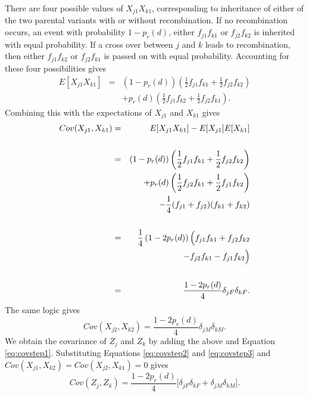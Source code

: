 \documentclass[sts]{imsart}
\begin{document}
There are four possible values of $X_{j1} X_{k1}$, corresponding to inheritance of either of the two parental variants with or without recombination. If no recombination occurs, an event with probability $1 - p_r(d)$, either $f_{j1} f_{k1}$ or $f_{j2} f_{k2}$ is inherited with equal probability. If a cross over between $j$ and $k$ leads to recombination, then either $f_{j1} f_{k2}$ or $f_{j2} f_{k1}$ is passed on with equal probability. Accounting for these four possibilities gives
\begin{eqnarray}
  E[X_{j1} X_{k1}] & = & (1 - p_r(d)) \left ( \frac{1}{2} f_{j1} f_{k1} + \frac{1}{2} f_{j2} f_{k2} \right ) \nonumber\\
  & & + p_r(d) \left ( \frac{1}{2} f_{j1} f_{k2} + \frac{1}{2} f_{j2} f_{k1} \right ). \nonumber
\end{eqnarray}
Combining this with the expectations of $X_{j1}$ and $X_{k1}$ gives
\begin{eqnarray}
    Cov(X_{j1}, X_{k1}) & = & E[X_{j1} X_{k1}] - E[X_{j1}]E[X_{k1}] \nonumber\\
    & & \nonumber\\
    & = & (1 - p_r(d)) \left ( \frac{1}{2} f_{j1} f_{k1} + \frac{1}{2} f_{j2} f_{k2} \right ) \nonumber \\
    & & + p_r(d) \left ( \frac{1}{2} f_{j2} f_{k1} + \frac{1}{2} f_{j1} f_{k2} \right ) \nonumber\\
    & & - \frac{1}{4} (f_{j1} + f_{j2})(f_{k1} + f_{k2}) \nonumber\\
    & & \nonumber\\
    & = & \frac{1}{4} \left ( 1 - 2 p_r(d) \right ) \Big ( f_{j1}f_{k1} + f_{j2}f_{k2} \nonumber \\
    & & \hspace{0.5cm}- f_{j2}f_{k1} - f_{j1}f_{k2} \Big ) \nonumber\\
    & & \nonumber\\
    & = & \frac{ 1 - 2 p_r(d)}{4}  \delta_{jF} \delta_{kF}. \label{eq:covstep2}
\end{eqnarray}
The same logic gives
\begin{equation} \label{eq:covstep3}
   Cov(X_{j2}, X_{k2}) = \frac{ 1 - 2 p_r(d)}{4}  \delta_{jM} \delta_{kM}.
\end{equation}
We obtain the covariance of $Z_j$ and $Z_k$ by adding the above and Equation \ref{eq:covstep1}. Substituting Equations \ref{eq:covstep2} and \ref{eq:covstep3} and $Cov(X_{j1}, X_{k2}) = Cov(X_{j2}, X_{k1}) = 0$ gives
\begin{equation} \label{eq:cov}
  Cov(Z_j, Z_k) = \frac{1 - 2 p_r(d)}{4} \Big [ \delta_{jF} \delta_{kF} + \delta_{jM} \delta_{kM} \Big ]. 
\end{equation}
\end{document}
